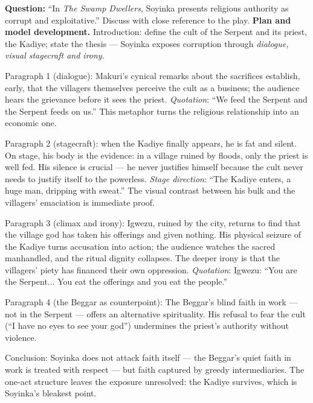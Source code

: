 \documentclass[11pt]{article}
\begin{document}
\begin{exoresolu}
\textbf{Question:} ``In \emph{The Swamp Dwellers}, Soyinka presents religious authority as corrupt and exploitative.'' Discuss with close reference to the play.
\tcblower
\textbf{Plan and model development.} Introduction: define the cult of the Serpent and its priest, the Kadiye; state the thesis — Soyinka exposes corruption through \emph{dialogue, visual stagecraft and irony}.

Paragraph 1 (dialogue): Makuri's cynical remarks about the sacrifices establish, early, that the villagers themselves perceive the cult as a business; the audience hears the grievance before it sees the priest. \emph{Quotation}: ``We feed the Serpent and the Serpent feeds on us.'' This metaphor turns the religious relationship into an economic one.

Paragraph 2 (stagecraft): when the Kadiye finally appears, he is fat and silent. On stage, his body is the evidence: in a village ruined by floods, only the priest is well fed. His silence is crucial — he never justifies himself because the cult never needs to justify itself to the powerless. \emph{Stage direction}: ``The Kadiye enters, a huge man, dripping with sweat.'' The visual contrast between his bulk and the villagers' emaciation is immediate proof.

Paragraph 3 (climax and irony): Igwezu, ruined by the city, returns to find that the village god has taken his offerings and given nothing. His physical seizure of the Kadiye turns accusation into action; the audience watches the sacred manhandled, and the ritual dignity collapses. The deeper irony is that the villagers' piety has financed their own oppression. \emph{Quotation}: Igwezu: ``You are the Serpent... You eat the offerings and you eat the people.''

Paragraph 4 (the Beggar as counterpoint): The Beggar's blind faith in work — not in the Serpent — offers an alternative spirituality. His refusal to fear the cult (``I have no eyes to see your god'') undermines the priest's authority without violence.

Conclusion: Soyinka does not attack faith itself — the Beggar's quiet faith in work is treated with respect — but faith captured by greedy intermediaries. The one-act structure leaves the exposure unresolved: the Kadiye survives, which is Soyinka's bleakest point.
\end{exoresolu}
\end{document}
